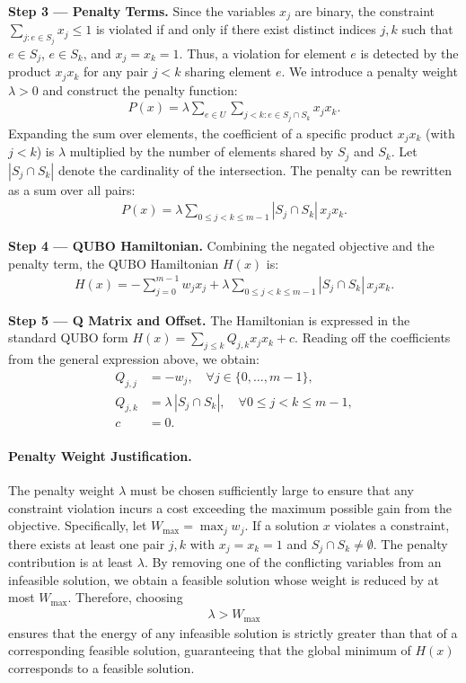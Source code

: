 \documentclass[12pt]{article}
\begin{document}
\textbf{Step 3 --- Penalty Terms.} Since the variables $x_j$ are binary, the constraint $\sum_{j : e \in S_j} x_j \le 1$ is violated if and only if there exist distinct indices $j, k$ such that $e \in S_j$, $e \in S_k$, and $x_j = x_k = 1$. Thus, a violation for element $e$ is detected by the product $x_j x_k$ for any pair $j < k$ sharing element $e$. We introduce a penalty weight $\lambda > 0$ and construct the penalty function:
\begin{align}
    P(x) = \lambda \sum_{e \in U} \sum_{j < k : e \in S_j \cap S_k} x_j x_k.
\end{align}
Expanding the sum over elements, the coefficient of a specific product $x_j x_k$ (with $j < k$) is $\lambda$ multiplied by the number of elements shared by $S_j$ and $S_k$. Let $|S_j \cap S_k|$ denote the cardinality of the intersection. The penalty can be rewritten as a sum over all pairs:
\begin{align}
    P(x) = \lambda \sum_{0 \le j < k \le m-1} |S_j \cap S_k| \, x_j x_k.
\end{align}

\textbf{Step 4 --- QUBO Hamiltonian.} Combining the negated objective and the penalty term, the QUBO Hamiltonian $H(x)$ is:
\begin{align}
    H(x) = -\sum_{j=0}^{m-1} w_j x_j + \lambda \sum_{0 \le j < k \le m-1} |S_j \cap S_k| \, x_j x_k.
\end{align}

\textbf{Step 5 --- Q Matrix and Offset.} The Hamiltonian is expressed in the standard QUBO form $H(x) = \sum_{j \le k} Q_{j,k} x_j x_k + c$. Reading off the coefficients from the general expression above, we obtain:
\begin{align}
    Q_{j,j} &= -w_j, \quad \forall j \in \{0, \dots, m-1\}, \\
    Q_{j,k} &= \lambda \, |S_j \cap S_k|, \quad \forall 0 \le j < k \le m-1, \\
    c &= 0.
\end{align}

\paragraph{Penalty Weight Justification.}
The penalty weight $\lambda$ must be chosen sufficiently large to ensure that any constraint violation incurs a cost exceeding the maximum possible gain from the objective. Specifically, let $W_{\max} = \max_{j} w_j$. If a solution $x$ violates a constraint, there exists at least one pair $j, k$ with $x_j = x_k = 1$ and $S_j \cap S_k \neq \emptyset$. The penalty contribution is at least $\lambda$. By removing one of the conflicting variables from an infeasible solution, we obtain a feasible solution whose weight is reduced by at most $W_{\max}$. Therefore, choosing
\begin{align}
    \lambda > W_{\max}
\end{align}
ensures that the energy of any infeasible solution is strictly greater than that of a corresponding feasible solution, guaranteeing that the global minimum of $H(x)$ corresponds to a feasible solution.
\end{document}
